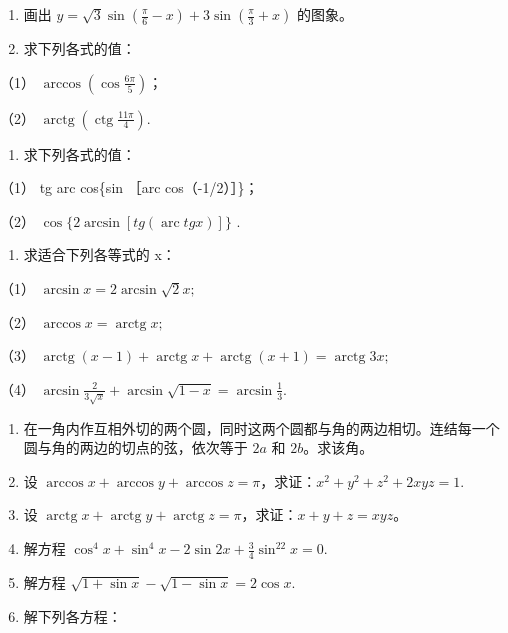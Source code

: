 \begin{enumerate}[start=57]
\item
  画出
  \(y = \sqrt{3} \sin \left( \frac{\pi}{6} - x \right) + 3 \sin \left( \frac{\pi}{3} + x \right)\)
  的图象。
\item
  求下列各式的值：
\end{enumerate}

（1） \(\arccos \left( \cos \frac{6\pi}{5} \right)\)；

（2）
\(\operatorname{arctg} \left( \operatorname{ctg} \frac{11\pi}{4} \right)\).

\begin{enumerate}[start=59]
\item
  求下列各式的值：
\end{enumerate}

（1） tg arc cos\{sin ［arc cos（-1/2）］\}；

（2） \(\cos\{2\arcsin[tg(\operatorname{arc}tg x)]\}\) .

\begin{enumerate}[start=60]
\item
  求适合下列各等式的 x：
\end{enumerate}

（1） \(\arcsin x = 2\arcsin \sqrt{2} x;\)

（2） \(\arccos x = \operatorname{arctg} x;\)

（3）
\(\operatorname{arctg}(x - 1) + \operatorname{arctg} x + \operatorname{arctg}(x + 1) = \operatorname{arctg} 3x;\)

（4）
\(\arcsin \frac{2}{3\sqrt{x}} + \arcsin \sqrt{1 - x} = \arcsin \frac{1}{3}\).

\begin{enumerate}[start=61]
\item
  在一角内作互相外切的两个圆，同时这两个圆都与角的两边相切。连结每一个圆与角的两边的切点的弦，依次等于
  \(2a\) 和 \(2b\)。求该角。
\item
  设
  \(\arccos x + \arccos y + \arccos z = \pi\)，求证：\(x^2 + y^2 + z^2 + 2xyz = 1\).
\item
  设
  \(\operatorname{arctg} x + \operatorname{arctg} y + \operatorname{arctg} z = \pi\)，求证：\(x + y + z = xyz\)。
\item
  解方程 \(\cos^4 x + \sin^4 x - 2\sin 2x + \frac{3}{4}\sin^22x = 0.\)
\item
  解方程 \(\sqrt{1 + \sin x} - \sqrt{1 - \sin x} = 2\cos x.\)
\item
  解下列各方程：
\end{enumerate}

